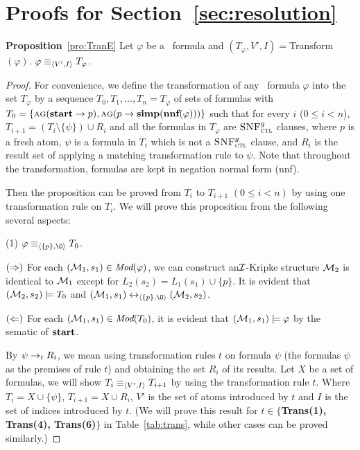 \documentclass[twoside,11pt]{article}
\begin{document}
	
	
	\section{Proofs for Section~\ref{sec:resolution}}
	
	
	
	
	
	\noindent\textbf{Proposition}~\ref{pro:TranE}
	Let $\varphi$ be a \CTL\ formula and $(T_{\varphi}, V',I)=$Transform$(\varphi)$.  $\varphi \equiv_{{\langle{V', I}\rangle}} T_{\varphi}$.
	\\
	\begin{proof}
		For convenience, we define the transformation of any \CTL\ formula $\varphi$ into the set $T_{\varphi}$ by a sequence $T_0, T_1,\dots, T_n=T_{\varphi}$ of sets of formulas with $T_0=\{\textsc{a} \textsc{g}(\textbf{start} \rightarrow p), \textsc{a} \textsc{g}(p \rightarrow \textbf{simp}(\textbf{nnf}(\varphi)))\}$
		such that for every $i$ ($0 \leq i< n$), $T_{i+1} = (T_i \setminus \{\psi\}) \cup R_i$ and all the formulas in $T_{\varphi}$ are ${\textsc{SNF}_{\textsc{ctl}}^g}$ clauses, where $p$ is a fresh atom, $\psi$ is a formula in $T_i$ which is not a ${\textsc{SNF}_{\textsc{ctl}}^g}$ clause, and $R_i$ is the result set of applying a matching transformation rule to $\psi$. Note that throughout the transformation, formulas are kept in negation normal form (nnf).
		
		Then the proposition can be proved from $T_i$ to $T_{i+1}$ $(0\leq i < n)$ by using one transformation rule on $T_i$.
		We will prove this proposition from the following several aspects:
		
		(1) $\varphi \equiv_{\tuple{\{p\}, {\O}}} T_0$.
		
		$(\Rightarrow)$ For each $({\cal M}_1,s_1) \in \textit{Mod}(\varphi)$, we can construct an${\cal I}$-Kripke structure ${\cal M}_2$ is identical to ${\cal M}_1$ except for $L_2(s_2) = L_1(s_1) \cup \{p\}$. It is evident that $({\cal M}_2,s_2) \models T_0$ and $(\Hm_1, s_1) \lrto_{\tuple{\{p\}, {\O}}} (\Hm_2, s_2)$.
		
		$(\Leftarrow)$ For each $({\cal M}_1,s_1) \in \textit{Mod}(T_0)$, it is evident that $({\cal M}_1,s_1) \models \varphi$ by the sematic of $\textbf{start}$.
		
		By $\psi \rightarrow_t R_i$, we mean using transformation rules $t$ on formula $\psi$ (the formulas $\psi$ as the
		premises of rule $t$) and obtaining the set  $R_i$ of its results. Let $X$ be a set of formulas,
		we will show $T_i \equiv_{{\langle{V',I}\rangle}} T_{i+1}$ by using the transformation rule $t$. Where $T_i= X \cup \{\psi\}$, $T_{i+1}=X \cup R_i$, $V'$ is the set of atoms introduced by $t$ and $I$ is the set of indices introduced by $t$. (We will prove this result for $t\in \{$\textbf{Trans(1), Trans(4), Trans(6)}$\}$ in Table~\ref{tab:trans}, while other cases can be proved similarly.)
		

\end{proof}
\end{document}
